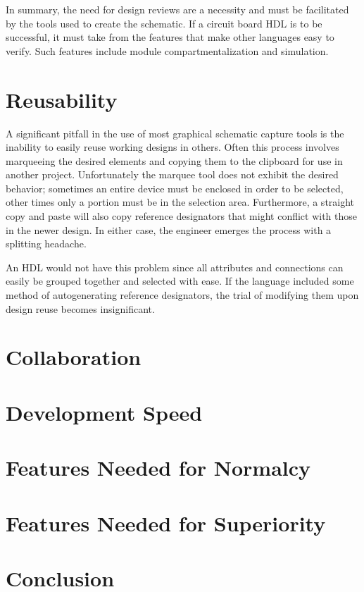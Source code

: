 \documentclass[10pt, draft, conference, letterpaper, twocolumn]{IEEEtran}
\begin{document}
	In summary, the need for design reviews are a necessity and must be
	facilitated by the tools used to create the schematic.  If a circuit board HDL
	is to be successful, it must take from the features that make other languages
	easy to verify.  Such features include module compartmentalization and
	simulation.
	
\section{Reusability}
	A significant pitfall in the use of most graphical schematic capture tools is
	the inability to easily reuse working designs in others.  Often this process
	involves marqueeing the desired elements and copying them to the clipboard for
	use in another project.  Unfortunately the marquee tool does not exhibit
	the desired behavior; sometimes an entire device must be enclosed in order to
	be selected, other times only a portion must be in the selection area. 
	Furthermore, a straight copy and paste will also copy reference designators
	that might conflict with those in the newer design.  In either case, the
	engineer emerges the process with a splitting headache.
	
	An HDL would not have this problem since all attributes and connections can
	easily be grouped together and selected with ease. If the language included
	some method of autogenerating reference designators, the trial of modifying
	them upon design reuse becomes insignificant.
	
\section{Collaboration}

\section{Development Speed}

\section{Features Needed for Normalcy}

\section{Features Needed for Superiority}

\section{Conclusion}
	
\end{document}
